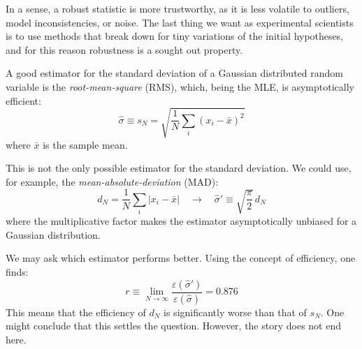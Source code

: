In a sense, a robust statistic is more trustworthy, as it is less volatile to outliers, model inconsistencies, or noise. The last thing we want as experimental scientists is to use methods that break down for tiny variations of the initial hypotheses, and for this reason robustness is a sought out property.

\begin{example}
	A good estimator for the standard deviation of a Gaussian distributed random variable is the \emph{root-mean-square} (RMS), which, being the MLE, is asymptotically efficient:
	\[
	\hat\sigma \equiv s_N = \sqrt{\frac{1}{N}\sum_i (x_i - \bar{x})^2}
	\]
	where $\bar{x}$ is the sample mean.
	
	This is not the only possible estimator for the standard deviation. We could use, for example, the \emph{mean-absolute-deviation} (MAD):
	\[
	d_N = \frac{1}{N}\sum_i |x_i - \bar{x}| \quad \rightarrow \quad \hat\sigma' \equiv \sqrt{\frac{\pi}{2}}\, d_N
	\]
	where the multiplicative factor makes the estimator asymptotically unbiased for a Gaussian distribution.
	
	We may ask which estimator performs better. Using the concept of efficiency, one finds:
	\[
	r \equiv \lim_{N \to \infty} \frac{\varepsilon(\hat\sigma')}{\varepsilon(\hat\sigma)} = 0.876
	\]
	This means that the efficiency of $d_N$ is significantly worse than that of $s_N$. One might conclude that this settles the question. However, the story does not end here.
	

\end{example}
